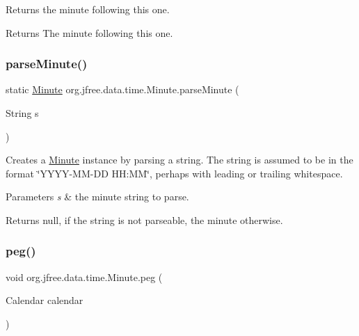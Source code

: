Returns the minute following this one.

\begin{DoxyReturn}{Returns}
The minute following this one. 
\end{DoxyReturn}
\mbox{\label{classorg_1_1jfree_1_1data_1_1time_1_1_minute_aef2f7b4032621c25bed43347ac34c1cc}} 
\subsubsection{\texorpdfstring{parse\+Minute()}{parseMinute()}}
{\footnotesize\ttfamily static \mbox{\hyperlink{classorg_1_1jfree_1_1data_1_1time_1_1_minute}{Minute}} org.\+jfree.\+data.\+time.\+Minute.\+parse\+Minute (\begin{DoxyParamCaption}\item[{String}]{s }\end{DoxyParamCaption})\hspace{0.3cm}{\ttfamily [static]}}

Creates a \mbox{\hyperlink{classorg_1_1jfree_1_1data_1_1time_1_1_minute}{Minute}} instance by parsing a string. The string is assumed to be in the format \char`\"{}\+Y\+Y\+Y\+Y-\/\+M\+M-\/\+D\+D H\+H\+:\+M\+M\char`\"{}, perhaps with leading or trailing whitespace.


\begin{DoxyParams}{Parameters}
{\em s} & the minute string to parse.\\
\hline
\end{DoxyParams}
\begin{DoxyReturn}{Returns}
{\ttfamily null}, if the string is not parseable, the minute otherwise. 
\end{DoxyReturn}
\mbox{\label{classorg_1_1jfree_1_1data_1_1time_1_1_minute_ae7da5fb521ede7ac4a60122fb99266d3}} 
\subsubsection{\texorpdfstring{peg()}{peg()}}
{\footnotesize\ttfamily void org.\+jfree.\+data.\+time.\+Minute.\+peg (\begin{DoxyParamCaption}\item[{Calendar}]{calendar }\end{DoxyParamCaption})}

